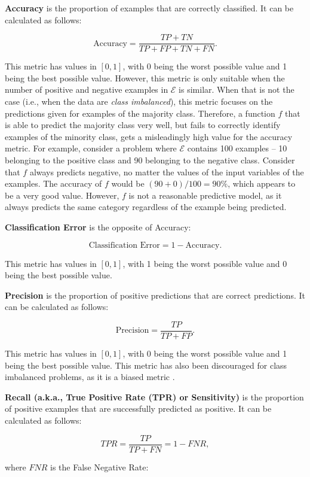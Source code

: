 \textbf{Accuracy} is the proportion of examples that are correctly classified. It can be calculated as follows:

\[ \text{Accuracy} = \frac{TP + TN}{TP+FP+TN+FN}. \]

\noindent This metric has values in $[0,1]$, with 0 being the worst possible value and 1 being the best possible value. 
However, this metric is only suitable when the number of positive and negative examples in $\mathcal{E}$ is similar. When that is not the case (i.e., when the data are \textit{class imbalanced}), this metric focuses on the predictions given for examples of the majority class. Therefore, a function $f$ that is able to predict the majority class very well, but fails to correctly identify examples of the minority class, gets a misleadingly high value for the accuracy metric. For example, consider a problem where $\mathcal{E}$ contains 100 examples -- 10 belonging to the positive class and 90 belonging to the negative class. Consider that $f$ always predicts negative, no matter the values of the input variables of the examples. The accuracy of $f$ would be $(90+0)/100 = 90\%$, which appears to be a very good value. However, $f$ is not a reasonable predictive model, as it always predicts the same category regardless of the example being predicted. 

\textbf{Classification Error} is the opposite of Accuracy:

\[\text{Classification Error} = 1 - \text{Accuracy}.\]

\noindent This metric has values in $[0,1]$, with 1 being the worst possible value and 0 being the best possible value.

\textbf{Precision} is the proportion of positive predictions that are correct predictions. It can be calculated as follows:

\[\text{Precision} = \frac{TP}{TP+FP}. \]

\noindent This metric has values in $[0,1]$, with 0 being the worst possible value and 1 being the best possible value. This metric has also been discouraged for class imbalanced problems, as it is a biased metric \cite{LuqueEtAl2019}.

\textbf{Recall (a.k.a., True Positive Rate (TPR) or Sensitivity)} is the proportion of positive examples that are successfully predicted as positive. It can be calculated as follows:

\[TPR = \frac{TP}{TP+FN} = 1 - FNR, \]

\noindent where $FNR$ is the False Negative Rate:

